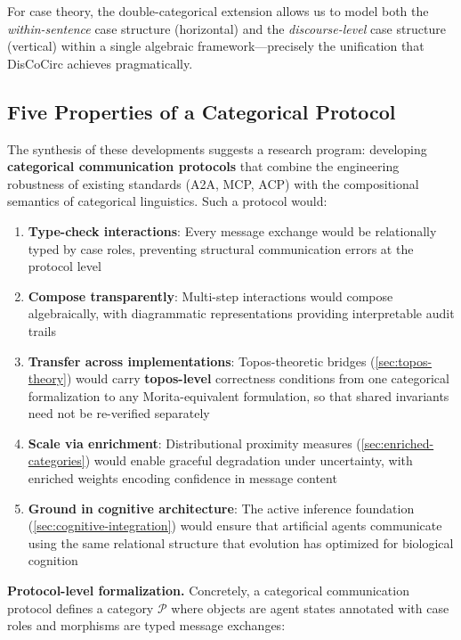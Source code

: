 \documentclass[
]{article}
\providecommand{\tightlist}{%
  \setlength{\itemsep}{0pt}\setlength{\parskip}{0pt}}
\begin{document}
For case theory, the double-categorical extension allows us to model
both the \emph{within-sentence} case structure (horizontal) and the
\emph{discourse-level} case structure (vertical) within a single
algebraic framework---precisely the unification that DisCoCirc achieves
pragmatically.

\subsection{Five Properties of a Categorical
Protocol}\label{five-properties-of-a-categorical-protocol}

The synthesis of these developments suggests a research program:
developing \textbf{categorical communication protocols} that combine the
engineering robustness of existing standards (A2A, MCP, ACP) with the
compositional semantics of categorical linguistics. Such a protocol
would:

\begin{enumerate}
\def\labelenumi{\arabic{enumi}.}
\tightlist
\item
  \textbf{Type-check interactions}: Every message exchange would be
  relationally typed by case roles, preventing structural communication
  errors at the protocol level
\item
  \textbf{Compose transparently}: Multi-step interactions would compose
  algebraically, with diagrammatic representations providing
  interpretable audit trails
\item
  \textbf{Transfer across implementations}: Topos-theoretic bridges
  (\autoref{sec:topos-theory}) would carry \textbf{topos-level}
  correctness conditions from one categorical formalization to any
  Morita-equivalent formulation, so that shared invariants need not be
  re-verified separately
\item
  \textbf{Scale via enrichment}: Distributional proximity measures
  (\autoref{sec:enriched-categories}) would enable graceful degradation
  under uncertainty, with enriched weights encoding confidence in
  message content
\item
  \textbf{Ground in cognitive architecture}: The active inference
  foundation (\autoref{sec:cognitive-integration}) would ensure that
  artificial agents communicate using the same relational structure that
  evolution has optimized for biological cognition
\end{enumerate}

\textbf{Protocol-level formalization.} Concretely, a categorical
communication protocol defines a category \(\mathcal{P}\) where objects
are agent states annotated with case roles and morphisms are typed
message exchanges:
\end{document}
